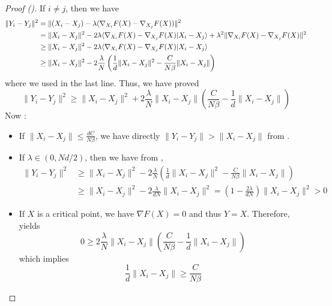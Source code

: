 \begin{proof}[Proof ()]
    If $i \neq j$, then we have
    \begin{align}
        \|Y_i - Y_j\|^2 &= \|(X_i - X_j) - \lambda (\nabla_{X_i} F(X) - \nabla_{X_j} F(X)) \|^2 \\
        &= \|X_i - X_j\|^2 - 2\lambda \langle\nabla_{X_i} F(X) - \nabla_{X_j} F(X)|X_i - X_j\rangle + \lambda^2 \|\nabla_{X_i} F(X) - \nabla_{X_j} F(X)\|^2 \\
        &\geq \|X_i - X_j\|^2 - 2\lambda \langle\nabla_{X_i} F(X) - \nabla_{X_j} F(X)|X_i - X_j\rangle \\
        &\geq \|X_i - X_j\|^2 - 2\frac{\lambda}{N} \left(\frac{1}{d} \|X_i - X_j\|^2 - \frac{C}{N\beta}\|X_i - X_j\|\right) 
    \end{align}
    where we used  in the last line. Thus, we have proved
    \begin{equation}
        \|Y_i - Y_j\|^2 \geq \|X_i - X_j\|^2 + 2\frac{\lambda}{N} \|X_i - X_j\| \left(\frac{C}{N\beta} - \frac{1}{d}\|X_i - X_j\|\right) \label{eq:grad_descent_iterates_distances}
    \end{equation}
    Now :
    \begin{itemize}
        \item If $\|X_i - X_j\| \leq \frac{dC}{N\beta}$, we have directly $\|Y_i - Y_j\| > \|X_i - X_j\|$ from .
        \item If $\lambda \in (0,Nd/2)$, then we have from ,
        \begin{align}
            \|Y_i - Y_j\|^2 &\geq \|X_i - X_j\|^2 - 2\frac{\lambda}{N} \left(\frac{1}{d} \|X_i - X_j\|^2 - \frac{C}{N\beta}\|X_i - X_j\|\right) \\
            &\geq \|X_i - X_j\|^2 - 2\frac{\lambda}{dN} \|X_i - X_j\|^2 = \left(1 - \frac{2\lambda}{dN}\right) \|X_i - X_j\|^2 > 0
        \end{align}
        \item If $X$ is a critical point, we have $\nabla F(X) = 0$ and thus $Y = X$. Therefore,  yields
        \begin{equation}
            0 \geq 2\frac{\lambda}{N} \|X_i - X_j\| \left(\frac{C}{N\beta} - \frac{1}{d} \|X_i - X_j\|\right)
        \end{equation}
        which implies
        \begin{equation}
            \frac{1}{d} \|X_i - X_j\| \geq \frac{C}{N\beta}
        \end{equation}
    \end{itemize}
\end{proof}

